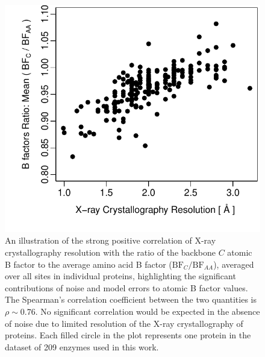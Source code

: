 \documentclass[11pt]{article}
\begin{document}
    \begin{figure}
        \begin{center}
        \includegraphics[width=5.5in]{mean_bfC_bfAA_ratio_resol.pdf}
        \end{center}
        \caption{An illustration of the strong positive correlation of X-ray crystallography resolution with the ratio of the backbone $C$ atomic B factor to the average amino acid B factor ($\text{BF}_C/\text{BF}_{AA}$), averaged over all sites in individual proteins, highlighting the significant contributions of noise and model errors to atomic B factor values. The Spearman's correlation coefficient between the two quantities is $\rho\sim0.76$. No significant correlation would be expected in the absence of noise due to limited resolution of the X-ray crystallography of proteins. Each filled circle in the plot represents one protein in the dataset of 209 enzymes used in this work.}
        \label{fig:bfC_bfAA_ratio}
    \end{figure}
\end{document}

